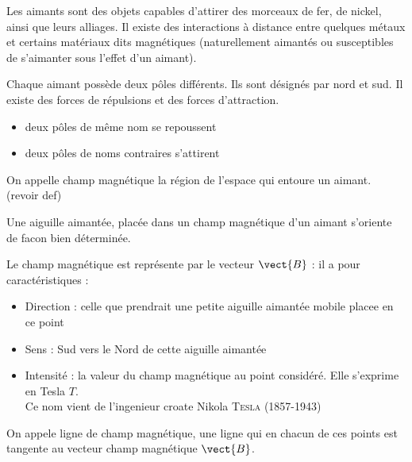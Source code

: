 
Les aimants sont des objets capables d'attirer des morceaux de fer, de nickel, ainsi que leurs alliages. Il existe des interactions \`a distance entre quelques m\'etaux et certains mat\'eriaux dits magn\'etiques (naturellement aimant\'es ou susceptibles de s'aimanter sous l'effet d'un aimant).



Chaque aimant poss\`ede deux p\^oles diff\'erents. Ils sont d\'esign\'es par nord et sud. Il existe des forces de r\'epulsions et des forces d'attraction.

\begin{itemize}
\item deux p\^oles de m\^eme nom se repoussent
\item deux p\^oles de noms contraires s'attirent
\end{itemize}

On appelle champ magn\'etique la r\'egion de l'espace qui entoure un aimant.
(revoir def)

Une aiguille aimant\'ee, plac\'ee dans un champ magn\'etique d'un aimant s'oriente de facon bien d\'etermin\'ee.




Le champ magn\'etique est repr\'esente par le vecteur $\vect{B}$ : il a pour caract\'eristiques :

\begin{itemize}
\item Direction : celle que prendrait une petite aiguille aimant\'ee mobile placee en ce point
\item Sens : Sud vers le Nord de cette aiguille aimant\'ee
\item Intensit\'e : la valeur du champ magn\'etique au point consid\'er\'e. Elle s'exprime en Tesla $T$.\\
Ce nom vient de l'ingenieur croate Nikola \textsc{Tesla} (1857-1943)
\end{itemize}

On appele ligne de champ magn\'etique, une ligne qui en chacun de ces points est tangente au vecteur champ magn\'etique $\vect{B}$.



